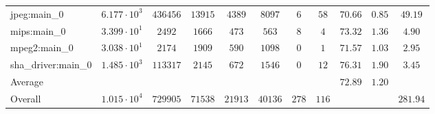 \begin{tabular}{|l|c|c|c|c|c|c|c|c|c|c|}
jpeg:main\_0            & $ 6.177 \cdot 10^{3} $ & $ 436456 $ & $ 13915 $ & $ 4389  $ & $ 8097  $ & $ 6   $ & $ 58  $ & $ 70.66       $ & $ 0.85    $ & $ 49.19   $ \\
mips:main\_0            & $ 3.399 \cdot 10^{1} $ & $ 2492   $ & $ 1666  $ & $ 473   $ & $ 563   $ & $ 8   $ & $ 4   $ & $ 73.32       $ & $ 1.36    $ & $ 4.90    $ \\
mpeg2:main\_0           & $ 3.038 \cdot 10^{1} $ & $ 2174   $ & $ 1909  $ & $ 590   $ & $ 1098  $ & $ 0   $ & $ 1   $ & $ 71.57       $ & $ 1.03    $ & $ 2.95    $ \\
sha\_driver:main\_0     & $ 1.485 \cdot 10^{3} $ & $ 113317 $ & $ 2145  $ & $ 672   $ & $ 1546  $ & $ 0   $ & $ 12  $ & $ 76.31       $ & $ 1.90    $ & $ 3.45    $ \\
\hline
Average                 & $                    $ & $        $ & $       $ & $       $ & $       $ & $     $ & $     $ & $ 72.89       $ & $ 1.20    $ & $         $ \\
\hline
Overall                 & $ 1.015 \cdot 10^{4} $ & $ 729905 $ & $ 71538 $ & $ 21913 $ & $ 40136 $ & $ 278 $ & $ 116 $ & $             $ & $         $ & $ 281.94  $ \\
\hline
\end{tabular}
